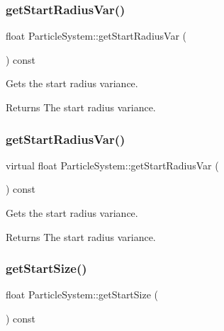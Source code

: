\subsubsection{\texorpdfstring{get\+Start\+Radius\+Var()}{getStartRadiusVar()}\hspace{0.1cm}{\footnotesize\ttfamily [1/2]}}
{\footnotesize\ttfamily float Particle\+System\+::get\+Start\+Radius\+Var (\begin{DoxyParamCaption}{ }\end{DoxyParamCaption}) const\hspace{0.3cm}{\ttfamily [virtual]}}

Gets the start radius variance.

\begin{DoxyReturn}{Returns}
The start radius variance. 
\end{DoxyReturn}
\mbox{\label{classParticleSystem_aded4933488666cc0ebc079d7c640f4e3}} 
\subsubsection{\texorpdfstring{get\+Start\+Radius\+Var()}{getStartRadiusVar()}\hspace{0.1cm}{\footnotesize\ttfamily [2/2]}}
{\footnotesize\ttfamily virtual float Particle\+System\+::get\+Start\+Radius\+Var (\begin{DoxyParamCaption}{ }\end{DoxyParamCaption}) const\hspace{0.3cm}{\ttfamily [virtual]}}

Gets the start radius variance.

\begin{DoxyReturn}{Returns}
The start radius variance. 
\end{DoxyReturn}
\mbox{\label{classParticleSystem_a31d1b7bd256455093c2edd2a560c9684}} 
\subsubsection{\texorpdfstring{get\+Start\+Size()}{getStartSize()}\hspace{0.1cm}{\footnotesize\ttfamily [1/2]}}
{\footnotesize\ttfamily float Particle\+System\+::get\+Start\+Size (\begin{DoxyParamCaption}{ }\end{DoxyParamCaption}) const\hspace{0.3cm}{\ttfamily [inline]}}

